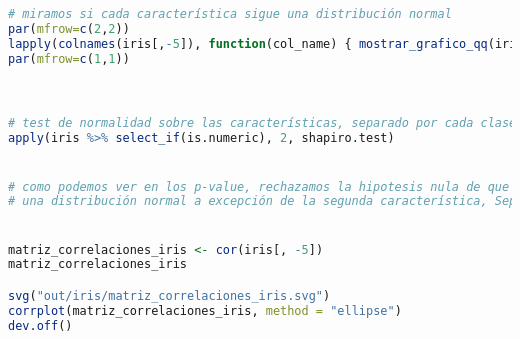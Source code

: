 \begin{lstlisting}[language=R]
# miramos si cada característica sigue una distribución normal
par(mfrow=c(2,2))
lapply(colnames(iris[,-5]), function(col_name) { mostrar_grafico_qq(iris[,col_name], col_name, save_plot = TRUE) } )
par(mfrow=c(1,1))



# test de normalidad sobre las características, separado por cada clase
apply(iris %>% select_if(is.numeric), 2, shapiro.test)


# como podemos ver en los p-value, rechazamos la hipotesis nula de que los datos siguen
# una distribución normal a excepción de la segunda característica, SepalWidth ,por muy poco


matriz_correlaciones_iris <- cor(iris[, -5])
matriz_correlaciones_iris

svg("out/iris/matriz_correlaciones_iris.svg")
corrplot(matriz_correlaciones_iris, method = "ellipse")
dev.off()
\end{lstlisting}
